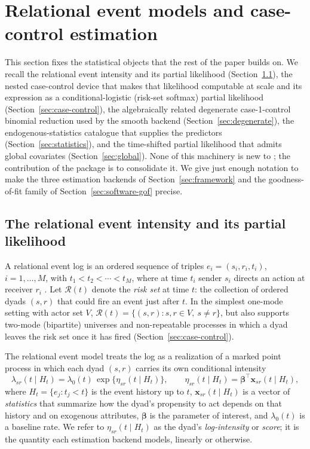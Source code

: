 \section{Relational event models and case-control estimation}
\label{sec:background}

This section fixes the statistical objects that the rest of the paper
builds on. We recall the relational event intensity and its partial
likelihood (Section~\ref{sec:rem-likelihood}), the nested case-control
device that makes that likelihood computable at scale and its expression
as a conditional-logistic (risk-set softmax) partial likelihood
(Section~\ref{sec:case-control}), the algebraically related degenerate
case-1-control binomial reduction used by the smooth backend
(Section~\ref{sec:degenerate}), the endogenous-statistics catalogue that
supplies the predictors (Section~\ref{sec:statistics}), and the
time-shifted partial likelihood that admits global covariates
(Section~\ref{sec:global}). None of this machinery is new to ;
the contribution of the package is to consolidate it. We give just enough
notation to make the three estimation backends of
Section~\ref{sec:framework} and the goodness-of-fit family of
Section~\ref{sec:software-gof} precise.

\subsection{The relational event intensity and its partial likelihood}
\label{sec:rem-likelihood}

A relational event log is an ordered sequence of triples
$e_i = (s_i, r_i, t_i)$, $i = 1, \dots, M$, with $t_1 < t_2 < \cdots <
t_M$, where at time $t_i$ sender $s_i$ directs an action at receiver
$r_i$ \citep{butts2008}. Let $\mathcal{R}(t)$ denote the \emph{risk set}
at time $t$: the collection of ordered dyads $(s, r)$ that could fire an
event just after $t$. In the simplest one-mode setting with actor set
$V$, $\mathcal{R}(t) = \{(s, r) : s, r \in V,\ s \neq r\}$, but
 also supports two-mode (bipartite) universes and
non-repeatable processes in which a dyad leaves the risk set once it has
fired (Section~\ref{sec:case-control}).

The relational event model treats the log as a realization of a marked
point process in which each dyad $(s,r)$ carries its own conditional
intensity
\begin{equation}
\lambda_{sr}(t \mid H_t)
  = \lambda_0(t)\,\exp\!\bigl\{\eta_{sr}(t \mid H_t)\bigr\},
  \qquad
\eta_{sr}(t \mid H_t) = \boldsymbol{\beta}^\top
   \mathbf{x}_{sr}(t \mid H_t),
\label{eq:intensity}
\end{equation}
where $H_t = \{e_j : t_j < t\}$ is the event history up to $t$,
$\mathbf{x}_{sr}(t \mid H_t)$ is a vector of \emph{statistics} that
summarize how the dyad's propensity to act depends on that history and on
exogenous attributes, $\boldsymbol{\beta}$ is the parameter of interest,
and $\lambda_0(t)$ is a baseline rate. We refer to
$\eta_{sr}(t \mid H_t)$ as the dyad's \emph{log-intensity} or
\emph{score}; it is the quantity each estimation backend models, linearly
or otherwise.


